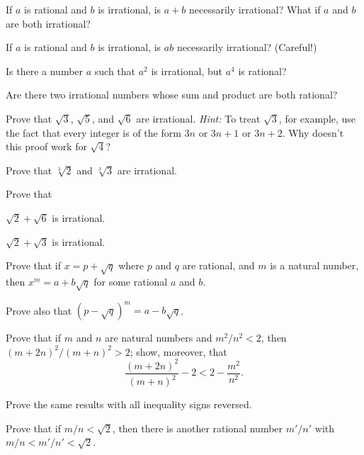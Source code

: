 \begin{letters}
\item If $a$ is rational and $b$ is irrational, is $a+b$ necessarily
  irrational? What if $a$ and $b$ are both irrational?
\item If $a$ is rational and $b$ is irrational, is $ab$ necessarily irrational?
  (Careful!)
\item Is there a number $a$ such that $a^2$ is irrational, but $a^4$ is
  rational?
\item Are there two irrational numbers whose sum and product are both
  rational?
\end{letters}

\begin{letters}
\item Prove that $\sqrt{3}$, $\sqrt{5}$, and $\sqrt{6}$ are irrational.
  \textit{Hint:} To treat $\sqrt{3}$, for example, use the fact that every
  integer is of the form $3n$ or $3n+1$ or $3n+2$. Why doesn't this proof
  work for $\sqrt{4}$?
\item Prove that $\sqrt[3]{2}$ and $\sqrt[3]{3}$ are irrational.
\end{letters}

 Prove that
\begin{letters}
\item $\sqrt{2} + \sqrt{6}$ is irrational.
\item $\sqrt{2} + \sqrt{3}$ is irrational.
\end{letters}

\begin{letters}
\item Prove that if $x = p + \sqrt{q}$ where $p$ and $q$ are rational, and
  $m$ is a natural number, then $x^m = a + b\sqrt{q}$ for some rational $a$
  and $b$.
\item Prove also that $(p - \sqrt{q})^m = a - b\sqrt{q}$.
\end{letters}

\begin{letters}
\item Prove that if $m$ and $n$ are natural numbers and $m^2/n^2 < 2$, then
  $(m+2n)^2/(m+n)^2 > 2$; show, moreover, that
\[ \frac{(m+2n)^2}{(m+n)^2} - 2 < 2 - \frac{m^2}{n^2}. \]
\item Prove the same results with all inequality signs reversed.
\item Prove that if $m/n < \sqrt{2}$, then there is another rational number
  $m'/n'$ with $m/n < m'/n' < \sqrt{2}$.
\end{letters}

